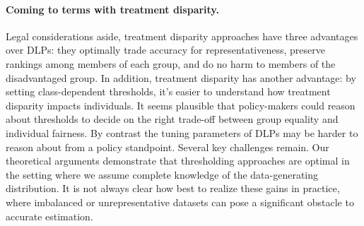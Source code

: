 
\vspace{-2mm}

\paragraph{Coming to terms with treatment disparity.}
Legal considerations aside, 
treatment disparity approaches 
have three advantages over DLPs: 
they optimally trade accuracy for representativeness, preserve rankings among members of each group,
and do no harm to members of the disadvantaged group. 
%
In addition,
treatment disparity has another advantage:
by setting class-dependent thresholds,
it's easier to understand
how treatment disparity impacts individuals. 
It seems plausible that policy-makers
could reason about thresholds 
to decide on the right trade-off
between group equality and individual fairness. 
By contrast the tuning parameters of DLPs
may be harder to reason about from a policy standpoint.
%
Several key challenges remain.  
Our theoretical arguments demonstrate 
that thresholding approaches are optimal 
in the setting where we assume complete knowledge 
of the data-generating distribution.  
It is not always clear how best 
to realize these gains in practice, 
where imbalanced or unrepresentative datasets 
can pose a significant obstacle to accurate estimation.

\vspace{-2mm}

